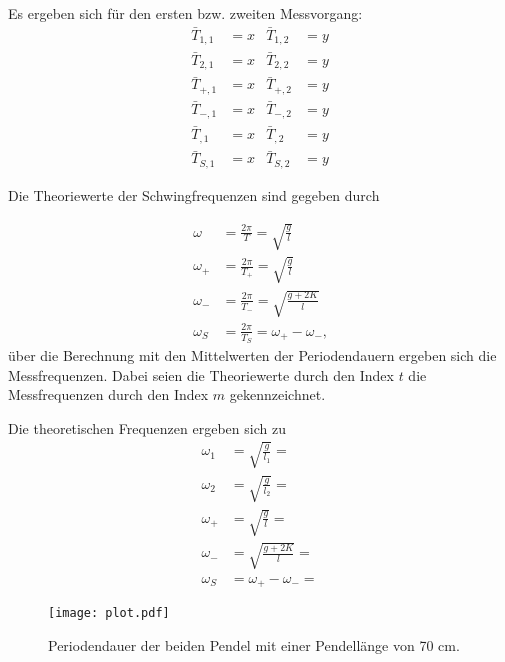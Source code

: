 Es ergeben sich für den ersten bzw. zweiten Messvorgang:
\begin{align}
  \bar{T}_{1,1} & = x  & \bar{T}_{1,2} & = y \\
  \bar{T}_{2,1} & = x  & \bar{T}_{2,2} & = y \\ 
  \bar{T}_{+,1} & = x  & \bar{T}_{+,2} & = y \\
  \bar{T}_{-,1} & = x  & \bar{T}_{-,2} & = y \\
  \bar{T}_{,1}  & = x  & \bar{T}_{,2}  & = y \\
  \bar{T}_{S,1} & = x  & \bar{T}_{S,2} & = y 
\end{align}

Die Theoriewerte der Schwingfrequenzen sind gegeben durch

\begin{align}
  \omega   & = \frac{2π}{T}     =   \sqrt{\frac{g}{l}} \\
  \omega_+ & = \frac{2π}{T_+} =   \sqrt{\frac{g}{l}} \\
  \omega_- & = \frac{2π}{T_-} =\sqrt{\frac{g+2K}{l}} \\
  \omega_S & = \frac{2π}{T_S} =  \omega_+ -\omega_- \text{,}
\end{align}
über die Berechnung mit den Mittelwerten der Periodendauern ergeben sich die Messfrequenzen. Dabei seien die Theoriewerte durch den Index $t$
die Messfrequenzen durch den Index $m$ gekennzeichnet.

Die theoretischen Frequenzen ergeben sich zu
\begin{align}
\omega_1 & = \sqrt{\frac{g}{l_1}} = \\
\omega_2 & = \sqrt{\frac{g}{l_2}} = \\
\omega_+ & = \sqrt{\frac{g}{l}} = \\
\omega_- & = \sqrt{\frac{g+2K}{l}} = \\
\omega_S & = \omega_+ -\omega_- =
\end{align} 



\begin{figure}
  \centering
  \texttt{[image: plot.pdf]}
  \caption{Periodendauer der beiden Pendel mit einer Pendellänge von 70 cm.}
  \label{fig:plot}
\end{figure}


